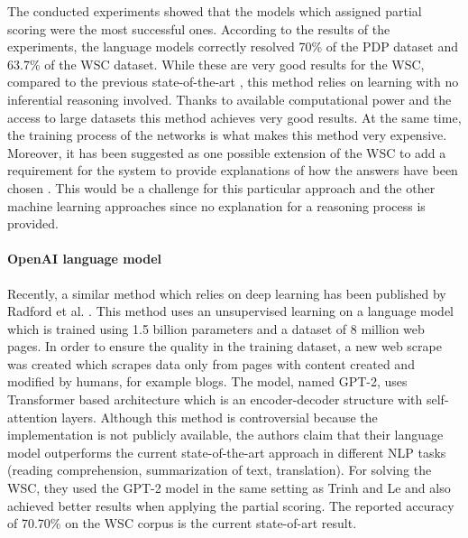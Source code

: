 The conducted experiments showed that the models which assigned partial scoring were the most successful ones. According to the results of the experiments, the language models correctly resolved 70\% of the PDP dataset and 63.7\% of the WSC dataset. 
While these are very good results for the WSC, compared to the previous state-of-the-art \cite{DBLP:journals/corr/LiuJLZWH16}, this method relies on learning with no inferential reasoning involved. Thanks to available computational power and the access to large datasets this method achieves very good results. At the same time, the training process of the networks is what makes this method very expensive. Moreover, it has been suggested as one possible extension of the WSC to add a requirement for the system to provide explanations of how the answers have been chosen \cite{DBLP:conf/aaai/MorgensternO15}. This would be a challenge for this particular approach and the other machine learning approaches since no explanation for a reasoning process is provided.   %

\paragraph{OpenAI language model}
Recently, a similar method which relies on deep learning has been published by Radford et al. \cite{radford2019language}. This method uses an unsupervised learning on a language model which is trained using 1.5 billion parameters and a dataset of 8 million web pages. In order to ensure the quality in the training dataset, a new web scrape was created which scrapes data only from pages with content created and modified by humans, for example blogs. The model, named GPT-2, uses Transformer based architecture \cite{DBLP:conf/nips/VaswaniSPUJGKP17} which is an encoder-decoder structure with self-attention layers. 
Although this method is controversial because the implementation is not publicly available, the authors claim that their language model outperforms the current state-of-the-art approach in different NLP tasks (reading comprehension, summarization of text, translation). For solving the WSC, they used the GPT-2 model in the same setting as Trinh and Le \cite{DBLP:journals/corr/abs-1806-02847} and also achieved better results when applying the partial scoring. The reported accuracy of 70.70\% on the WSC corpus is the current state-of-art result. 


